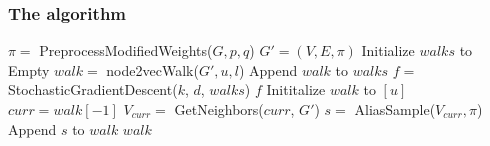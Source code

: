 

\subsubsection{The \nodevec algorithm}
 
\begin{algorithm}[h]
\begin{algorithmic}
\STATE {}
\STATE $\pi =$ PreprocessModifiedWeights($G, p, q$)
\STATE $G' = (V, E, \pi)$
\STATE Initialize $walks$ to Empty
\STATE $walk =$ node2vecWalk($G', u, l$)
\STATE Append $walk$ to $walks$
\ENDFOR
\ENDFOR
\STATE $f =$ StochasticGradientDescent($k$, $d$, $walks$)
 $f$
\STATE \hspace{-0.15in} \hrulefill
\STATE {}
\STATE Inititalize $walk$ to $[u]$
\STATE $curr = walk[-1]$
\STATE $V_{curr} =$ GetNeighbors($curr$, $G'$)
\STATE $s =$ AliasSample($V_{curr}, \pi$)
\STATE Append $s$ to $walk$
\ENDFOR
{} $walk$
\end{algorithmic}
\caption{The \nodevec algorithm.}
\label{alg:node2vec}
\end{algorithm}

